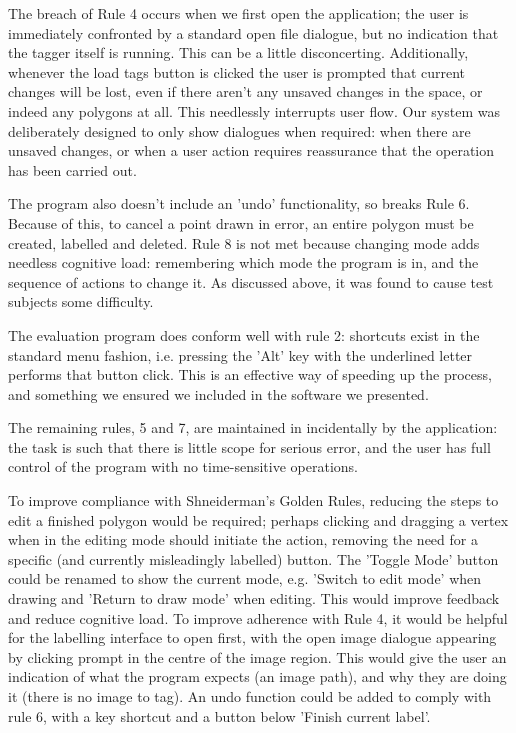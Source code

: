 \documentclass[a4paper,11pt,oneside]{article}
\begin{document}
The breach of Rule 4 occurs when we first open the application; the user is immediately confronted by a standard open file dialogue, but no indication that the tagger itself is running. This can be a little disconcerting. Additionally, whenever the load tags button is clicked the user is prompted that current changes will be lost, even if there aren't any unsaved changes in the space, or indeed any polygons at all. This needlessly interrupts user flow. Our system was deliberately designed to only show dialogues when required: when there are unsaved changes, or when a user action requires reassurance that the operation has been carried out. 

The program also doesn't include an 'undo' functionality, so breaks Rule 6. Because of this, to cancel a point drawn in error, an entire polygon must be created, labelled and deleted. Rule 8 is not met because changing mode adds needless cognitive load: remembering which mode the program is in, and the sequence of actions to change it. As discussed above, it was found to cause test subjects some difficulty.

The evaluation program does conform well with rule 2: shortcuts exist in the standard menu fashion, i.e. pressing the 'Alt' key with the underlined letter performs that button click. This is an effective way of speeding up the process, and something we ensured we included in the software we presented.

The remaining rules, 5 and 7, are maintained in incidentally by the application: the task is such that there is little scope for serious error, and the user has full control of the program with no time-sensitive operations.

To improve compliance with Shneiderman's Golden Rules, reducing the steps to edit a finished polygon would be required; perhaps clicking and dragging a vertex when in the editing mode should initiate the action, removing the need for a specific (and currently misleadingly labelled) button. The 'Toggle Mode' button could be renamed to show the current mode, e.g. 'Switch to edit mode' when drawing and 'Return to draw mode' when editing. This would improve feedback and reduce cognitive load. To improve adherence with Rule 4, it would be helpful for the labelling interface to open first, with the open image dialogue appearing by clicking prompt in the centre of the image region. This would give the user an indication of what the program expects (an image path), and why they are doing it (there is no image to tag). An undo function could be added to comply with rule 6, with a key shortcut and a button below 'Finish current label'.
\end{document}
